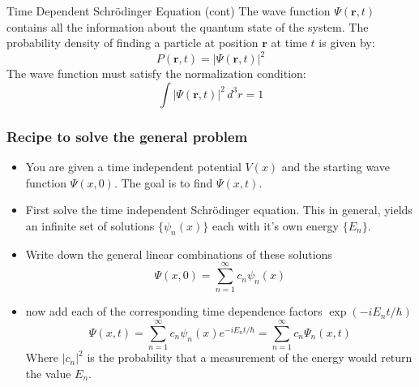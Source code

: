 \begin{frame}{Time Dependent Schrödinger Equation (cont)}
	The wave function $\Psi(\mathbf{r}, t)$ contains all the information about the quantum state of the system. The probability density of finding a particle at position $\mathbf{r}$ at time $t$ is given by:
	\begin{equation*}
		P(\mathbf{r}, t) = |\Psi(\mathbf{r}, t)|^2
	\end{equation*}
	The wave function must satisfy the normalization condition:
	\begin{equation*}
		\int |\Psi(\mathbf{r}, t)|^2 \, d^3r = 1
	\end{equation*}
\end{frame}

\begin{frame}
	\frametitle{Recipe to solve the general problem}

	\begin{itemize}
		\item You are given a time independent potential $V(x)$ and the starting wave function $\Psi (x,0)$. The goal is to find $\Psi(x,t)$.
		\item First solve the time independent Schrödinger equation. This in general, yields an infinite set of solutions $\{\psi_n(x)\}$ each with it's own energy $\{E_n\}$.
		\item Write down the general linear combinations of these solutions  $$ \Psi(x,0) = \sum_{n=1}^\infty c_n \psi_n(x)$$
		\item now add each of the corresponding time dependence factors $\exp(-i E_n t /\hbar)$
		      \[
			      \Psi(x,t) = \sum_{n=1}^{\infty} c_n \psi_n(x) e^{-iE_n t/ \hbar} = \sum_{n=1}^{\infty} c_n \Psi_n(x,t)
		      \]
		      Where $|c_n|^2$ is the probability that a measurement of the energy would return the value $E_n$.
	\end{itemize}
\end{frame}
